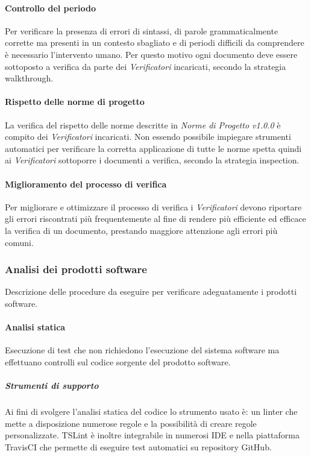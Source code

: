 \paragraph{Controllo del periodo} \Spazio
Per verificare la presenza di errori di sintassi, di parole grammaticalmente corrette ma presenti in un contesto sbagliato e di periodi difficili da comprendere è necessario l'intervento umano. Per questo motivo ogni documento deve essere sottoposto a verifica da parte dei \emph{Verificatori} incaricati, secondo la strategia walkthrough.

\paragraph{Rispetto delle norme di progetto} \Spazio
La verifica del rispetto delle norme descritte in \emph{Norme di Progetto v1.0.0} è compito dei \emph{Verificatori} incaricati. Non essendo possibile impiegare strumenti automatici per verificare la corretta applicazione di tutte le norme spetta quindi ai \emph{Verificatori} sottoporre i documenti a verifica, secondo la strategia inspection.

\paragraph{Miglioramento del processo di verifica} \Spazio
Per migliorare e ottimizzare il processo di verifica i \emph{Verificatori} devono riportare gli errori riscontrati più frequentemente al fine di rendere più efficiente ed efficace la verifica di un documento, prestando maggiore attenzione agli errori più comuni.
\subsubsection{Analisi dei prodotti software}
Descrizione delle procedure da eseguire per verificare adeguatamente i prodotti software.
\paragraph{Analisi statica}\Spazio
Esecuzione di test che non richiedono l'esecuzione del sistema software ma effettuano controlli sul codice sorgente del prodotto software.
\subparagraph{Strumenti di supporto}\Spazio
Ai fini di svolgere l'analisi statica del codice lo strumento usato è:  un linter che mette a disposizione numerose regole e la possibilità di creare regole personalizzate. TSLint è inoltre integrabile in numerosi IDE e nella piattaforma TravisCI che permette di eseguire test automatici su repository GitHub.
